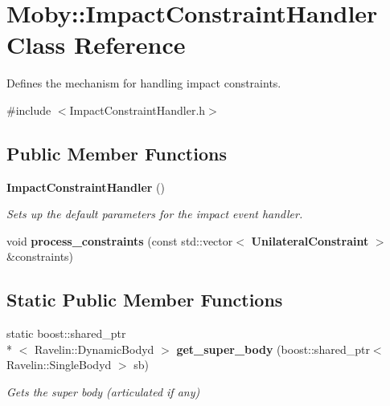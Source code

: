 \section{Moby\-:\-:Impact\-Constraint\-Handler Class Reference}
\label{classMoby_1_1ImpactConstraintHandler}


Defines the mechanism for handling impact constraints.  




{\ttfamily \#include $<$Impact\-Constraint\-Handler.\-h$>$}

\subsection*{Public Member Functions}
\begin{DoxyCompactItemize}
\item 
{\bf Impact\-Constraint\-Handler} ()\label{classMoby_1_1ImpactConstraintHandler_ac40db75508e330d0e3506f834b7309d3}

\begin{DoxyCompactList}\small\item\em Sets up the default parameters for the impact event handler. \end{DoxyCompactList}\item 
void {\bf process\-\_\-constraints} (const std\-::vector$<$ {\bf Unilateral\-Constraint} $>$ \&constraints)
\end{DoxyCompactItemize}
\subsection*{Static Public Member Functions}
\begin{DoxyCompactItemize}
\item 
static boost\-::shared\-\_\-ptr\\*
$<$ Ravelin\-::\-Dynamic\-Bodyd $>$ {\bf get\-\_\-super\-\_\-body} (boost\-::shared\-\_\-ptr$<$ Ravelin\-::\-Single\-Bodyd $>$ sb)\label{classMoby_1_1ImpactConstraintHandler_a6a55cfa8839ea011b8586406c85ab0fc}

\begin{DoxyCompactList}\small\item\em Gets the super body (articulated if any) \end{DoxyCompactList}\end{DoxyCompactItemize}
